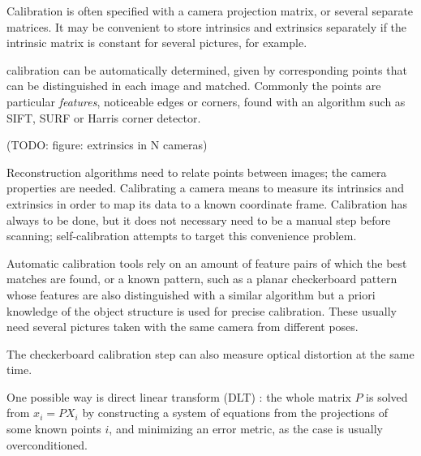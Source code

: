 Calibration is often specified with a camera projection matrix, or several separate matrices.
It may be convenient to store intrinsics and extrinsics separately if the intrinsic matrix is constant for several pictures, for example.

calibration can be automatically determined, given by corresponding points that can be distinguished in each image and matched. Commonly the points are particular \emph{features}, noticeable edges or corners, found with an algorithm such as SIFT, SURF or Harris corner detector. %


(TODO: figure: extrinsics in N cameras)

Reconstruction algorithms need to relate points between images; the camera properties are needed.
Calibrating a camera means to measure its intrinsics and extrinsics in order to map its data to a known coordinate frame.
Calibration has always to be done, but it does not necessary need to be a manual step before scanning; self-calibration attempts to target this convenience problem. \cite{pollefeys1999hand,hartley03multiview}


Automatic calibration tools rely on an amount of feature pairs of which the best matches are found, or a known pattern, such as a planar checkerboard pattern \cite{chuang2002performance,zhang2000flexible} whose features are also distinguished with a similar algorithm but a priori knowledge of the object structure is used for precise calibration.
These usually need several pictures taken with the same camera from different poses.

The checkerboard calibration step can also measure optical distortion at the same time. \cite{opencv,camcalmatlab}



One possible way is direct linear transform (DLT) \cite{hartley03multiview}: the whole matrix $P$ is solved from $x_i = PX_i$ by constructing a system of equations from the projections of some known points $i$, and minimizing an error metric, as the case is usually overconditioned.

